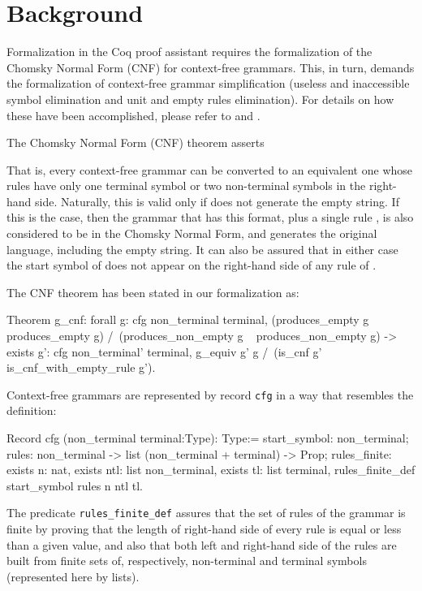 \documentclass {elsarticle}
\begin{document}
\section {Background}
\label {sec-background}

Formalization in the Coq proof assistant requires the formalization of the Chomsky Normal Form (CNF) for context-free grammars. This, in turn, demands the formalization of context-free grammar simplification (useless and inaccessible symbol elimination and unit and empty rules elimination). For details on how these have been accomplished, please refer to \cite {ramos-2015} and \cite {ramos-2016}. 

The Chomsky Normal Form (CNF) theorem asserts 




That is, every context-free grammar can be converted to an equivalent one whose rules have only one terminal symbol or two non-terminal symbols in the right-hand side. Naturally, this is valid only if  does not generate the empty string. If this is the case, then the grammar that has this format, plus a single rule , is also considered to be in the Chomsky Normal Form, and generates the original language, including the empty string. It can also be assured that in either case the start symbol of  does not appear on the right-hand side of any rule of .

The CNF theorem has been stated in our formalization as:

\begin{coq}
Theorem g_cnf:
forall g: cfg non_terminal terminal,
(produces_empty g \/ ~ produces_empty g) /\ 
(produces_non_empty g \/ ~ produces_non_empty g) ->
exists g': cfg non_terminal' terminal, 
g_equiv g' g /\ 
(is_cnf g' \/ is_cnf_with_empty_rule g').
\end{coq}

Context-free grammars are represented by record \texttt {cfg} in a way that resembles the definition:

\begin{coq}
Record cfg (non_terminal terminal:Type): Type:= {
start_symbol: non_terminal;
rules: non_terminal -> list (non_terminal + terminal) -> Prop;
rules_finite:
         exists n: nat,
         exists ntl: list non_terminal,
         exists tl: list terminal,
         rules_finite_def start_symbol rules n ntl tl}.
\end{coq}

The predicate \texttt {rules\_finite\_def} assures that the set of rules of the grammar is finite by proving that the length of right-hand side of every rule is equal or less than a given value, and also that both left and right-hand side of the rules are built from finite sets of, respectively, non-terminal and terminal symbols (represented here by lists).
\end{document}
